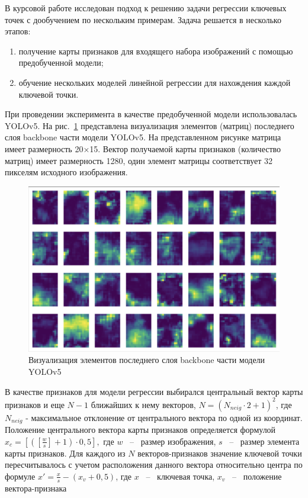 \documentclass[a4paper,14pt]{article}
\begin{document}
    В курсовой работе исследован подход к решению задачи регрессии ключевых точек с дообучением по нескольким примерам. 
    Задача решается в несколько этапов:
     \begin{enumerate}
    	[1)]
    	\itemsep0em
    	\item получение карты признаков для входящего набора изображений с помощью предобученной модели;
    	\item обучение нескольких моделей линейной регрессии для нахождения каждой ключевой точки.
    \end{enumerate}
	При проведении эксперимента в качестве предобученной модели использовалась YOLOv5. 
	На рис.~\ref{fig:stage9_SPPF_features} представлена визуализация элементов (матриц) последнего слоя backbone части модели YOLOv5. На представленном рисунке матрица имеет размерность 20×15. Вектор получаемой карты признаков (количество матриц) имеет размерность 1280, один элемент матрицы соответствует 32 пикселям исходного изображения. 
	\begin{figure}[H]
		\centering
		\includegraphics[width=0.7\linewidth]{images/stage9_SPPF_features}
		\caption{Визуализация элементов последнего слоя backbone части модели YOLOv5}
		\label{fig:stage9_SPPF_features}
	\end{figure}
	
	В качестве признаков для модели регрессии выбирался центральный вектор карты признаков и еще $N - 1$ ближайших к нему векторов, $N = (N_{neig} \cdot 2 + 1)^2$, где $N_{neig}$ - максимальное отклонение от центрального вектора по одной из координат.
	Положение центрального вектора карты признаков определяется формулой $x_c =\left[\left( [\frac{w}{s}]+1\right) \cdot 0,5\right],$ где $w$ ~--~ размер изображения, $s$ ~--~ размер элемента карты признаков.
	Для каждого из $N$ векторов-признаков значение ключевой точки пересчитывалось с учетом расположения данного вектора относительно центра по формуле $x' = \frac{x}{s} - (x_v + 0,5)$, где $x$ ~--~ ключевая точка, $x_v$ ~--~ положение вектора-признака
	
\end{document}

